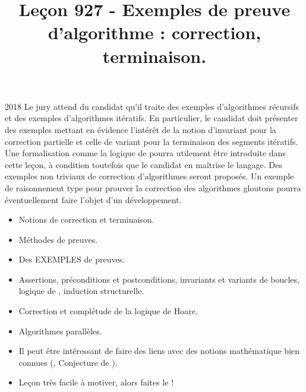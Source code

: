 \documentclass{agregfiche}
\title{Leçon 927 - Exemples de preuve d’algorithme :  correction, terminaison.}
\begin{document}
\maketitle

\secrapports
\begin{rapport}{2018}
    Le jury attend du candidat qu’il traite des exemples d’algorithmes récursifs et des exemples d’algorithmes itératifs.
    En particulier, le candidat doit présenter des exemples mettant en évidence l’intérêt de la notion
    d’invariant pour la correction partielle et celle de variant pour la terminaison des segments itératifs.
    Une formalisation comme la logique de  pourra utilement être introduite dans cette leçon, à
    condition toutefois que le candidat en maîtrise le langage. Des exemples non triviaux de correction
    d’algorithmes seront proposés. Un exemple de raisonnement type pour prouver la correction des algorithmes gloutons pourra éventuellement faire l’objet d’un développement.
\end{rapport}

\secindispensables

\begin{itemize}
	\item Notions de correction et terminaison.
    \item Méthodes de preuves.
    \item Des EXEMPLES de preuves.
\end{itemize}

\secasavoir

\begin{itemize}
	\item Assertions, préconditions et
    postconditions, invariants et variants de boucles, logique de , induction structurelle.
\end{itemize}

\secidees

\begin{itemize}
    \item Correction et complétude de la logique de Hoare.
    \item Algorithmes parallèles.
\end{itemize}

\secpieges

\begin{itemize}
     \item Il peut être intéressant de faire des liens avec des
       notions mathématique bien connues (, Conjecture de
       ).
     \item Leçon très facile à motiver, alors faites le !
\end{itemize}
\end{document}
